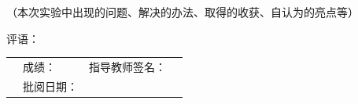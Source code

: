 \documentclass[UTF8,a4paper,12pt,fontset=fandol]{ctexart}
\begin{document}
\begin{tcolorbox}[mybox,
  title={\zihao{-3}\bfseries 小结}]
\vspace{1cm}
（本次实验中出现的问题、解决的办法、取得的收获、自认为的亮点等）
\vspace{1cm}

\end{tcolorbox}

\begin{tcolorbox}[mybox,
  title={\zihao{-3}\bfseries 指导教师评语及成绩}]

评语：

\vspace{3cm}

\begin{tabular}{p{6cm}p{2cm}p{4cm}p{4cm}}
\hfill & \hfill 成绩：& \hfill 指导教师签名：& \hfill \\
\hfill & \hfill 批阅日期：& \hfill & \hfill \\
\end{tabular}
\end{tcolorbox}
\end{document}
